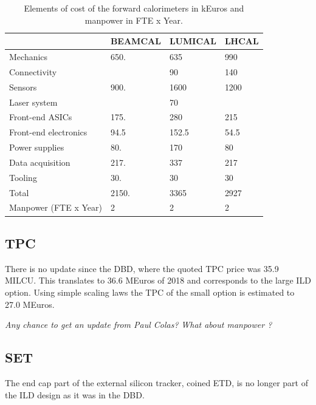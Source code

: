  \begin{table}\hspace*{-0cm}\small 
\begin{tabular}[h!]{ l p{0.2\hsize}p{0.2\hsize}p{0.2\hsize} }
\toprule
& BEAMCAL & LUMICAL & LHCAL \\
\midrule
Mechanics              & 650.   & 635    & 990   \\
Connectivity           &        & 90     & 140   \\
Sensors                & 900.   & 1600   & 1200  \\
Laser system           &        & 70     &       \\
Front-end ASICs        & 175.   & 280    & 215   \\
Front-end electronics  & 94.5   & 152.5  & 54.5  \\
Power supplies         & 80.    & 170    & 80    \\
Data acquisition       & 217.   & 337    & 217   \\
Tooling                & 30.    & 30     & 30    \\
\midrule
Total                  & 2150.  & 3365   & 2927  \\
\midrule
Manpower (FTE x Year)  &2       &2       & 2 \\
\bottomrule
\end{tabular}
\caption{\label{FCals_summary}Elements of cost of the forward calorimeters in kEuros and manpower in FTE x Year.}
\end{table}

\subsection{TPC}
There is no update since the DBD, where the quoted TPC price was 35.9 MILCU. This translates to 36.6 MEuros of 2018 and corresponds to the large ILD option. Using simple scaling laws the TPC of the small option is estimated to 27.0 MEuros. 

\textit{ Any chance to get an update from Paul Colas?}
\textit{What about manpower ?}

\subsection{SET}
The end cap part of the external silicon tracker, coined ETD, is no longer part of the ILD design as it was in the DBD.


